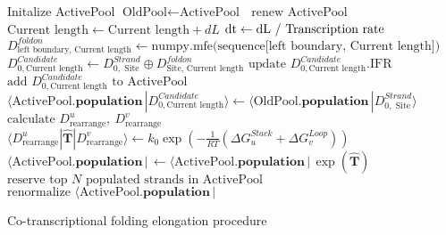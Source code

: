 \documentclass[11pt, a4paper]{article}
\begin{document}
\begin{algorithm}
  \begin{algorithmic}[1]
    \State Initalize ActivePool
      \State $\text{OldPool} \gets \text{ActivePool }$
      \State $\text{renew ActivePool }$
      \State $\text{Current length} \gets \text{Current length} + dL$
      \State $\text{dt} \gets \text{dL / \text{Transcription rate}}$
        \State $D^{foldon}_{\text{left boundary}, \text{ Current length}} \gets \text{numpy.mfe(sequence[left boundary, Current length]})$
      \EndFor
          \State $D^{Candidate}_{0,\text{Current length}} \gets D^{Strand}_{0, \text{ Site}} \oplus D^{foldon}_{\text{Site}, \text{ Current length}}$
            \State $\text{update $D^{Candidate}_{0,\text{Current length}}$.IFR}$
          \Else
            \State $\text{add $D^{Candidate}_{0,\text{Current length}}$ to ActivePool}$
          \EndIf
            \State $\langle \text{ActivePool}.\textbf{population}\,|D^{Candidate}_{0,\text{Current length}}\rangle \gets \langle \text{OldPool}.\textbf{population}\,|D^{Strand}_{0, \text{ Site}}\rangle$
          \EndIf
        \EndFor
      \EndFor
        \State $\text{calculate  } D^{u}_{\text{rearrange}} ,\ D^{v}_{\text{rearrange}}$
        \State $\langle D^{u}_{\text{rearrange}} | \hat{\mathbf{T}} |D^{v}_{\text{rearrange}} \rangle \gets k_0 \exp(-\frac{1}{RT}(\Delta G^{Stack}_{u}+\Delta G^{Loop}_{v}) )$
      \EndFor
      \State $\langle \text{ActivePool}.\textbf{population}\,|\, \gets \langle \text{ActivePool}.\textbf{population}\,|\, \exp(\hat{\mathbf{T}}) $
      \State $\text{reserve top $N$ populated strands in ActivePool}$
      \State $\text{renormalize }\langle \text{ActivePool}.\textbf{population}\,|$
    \EndWhile
  \end{algorithmic}
\caption{Co-transcriptional folding elongation procedure}
\end{algorithm}
\end{document}
